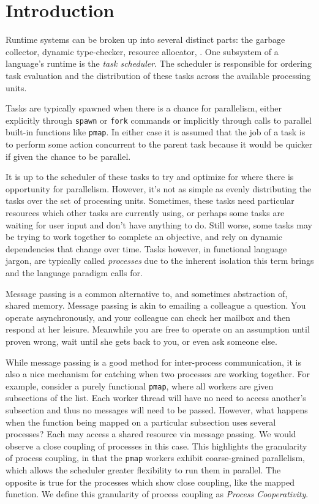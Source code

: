 \chapter{Introduction}
%
\label{chap:introduction}

Runtime systems can be broken up into several distinct parts: the garbage 
collector, dynamic type-checker, resource allocator, \etc. One 
subsystem of a language's runtime is the {\em task scheduler}. The scheduler is 
responsible for ordering task evaluation and the distribution of 
these tasks across the available processing units.

Tasks are typically spawned when there is a chance for parallelism, either 
explicitly through \texttt{spawn} or \texttt{fork} commands or implicitly 
through calls to parallel built-in functions like \texttt{pmap}. In either 
case it is assumed that the job of a task is to perform some action concurrent 
to the parent task because it would be quicker if given the chance to be 
parallel.

It is up to the scheduler of these tasks to try and optimize for where there
is opportunity for parallelism. However, it's not as simple as evenly 
distributing the tasks over the set of processing units. Sometimes, these 
tasks need particular resources which other tasks are currently using,
or perhaps some tasks are waiting for user input and don't have anything to
do. Still worse, some tasks may be trying to work together to complete an 
objective, and rely on dynamic dependencies that change over time.
Tasks however, in functional language jargon, are typically called 
{\em processes} due to the inherent isolation this term brings and the language 
paradigm calls for. 

Message passing is a common alternative to, and sometimes abstraction of, shared
memory. Message passing is akin to emailing a colleague a question. You operate
asynchronously, and your colleague can check her mailbox and then
respond at her leisure. Meanwhile you are free to operate on an assumption 
until proven wrong, wait until she gets back to you, or even ask someone else.

While message passing is a good method for inter-process communication, it is
also a nice mechanism for catching when two processes are working together.
For example, consider a purely functional \texttt{pmap}, where all 
workers are given subsections of the list. Each worker thread will have no
need to access another's subsection and thus no messages will need to be passed.
However, what happens when the function being mapped on a particular subsection uses 
several processes? Each may access a shared resource via message passing. 
We would observe a close coupling of processes in this case.
This highlights the granularity of process coupling, in that the \texttt{pmap}
workers exhibit coarse-grained parallelism, which allows the scheduler greater 
flexibility to run them in parallel. The opposite is true for the processes 
which show close coupling, like the mapped function. We define this granularity of process
coupling as {\em Process Cooperativity}.

